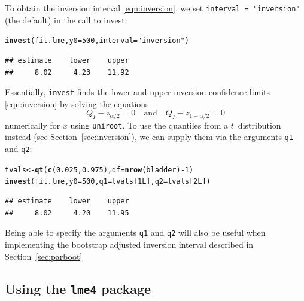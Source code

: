 \documentclass{article}\usepackage[]{graphicx}\usepackage[]{color}
\makeatletter
\newcommand{\hlnum}[1]{\textcolor[rgb]{0.686,0.059,0.569}{#1}}%
\newcommand{\hlstr}[1]{\textcolor[rgb]{0.192,0.494,0.8}{#1}}%
\newcommand{\hlopt}[1]{\textcolor[rgb]{0,0,0}{#1}}%
\newcommand{\hlstd}[1]{\textcolor[rgb]{0.345,0.345,0.345}{#1}}%
\newcommand{\hlkwb}[1]{\textcolor[rgb]{0.69,0.353,0.396}{#1}}%
\newcommand{\hlkwc}[1]{\textcolor[rgb]{0.333,0.667,0.333}{#1}}%
\newcommand{\hlkwd}[1]{\textcolor[rgb]{0.737,0.353,0.396}{\textbf{#1}}}%
\newenvironment{kframe}{%
 \def\at@end@of@kframe{}%
 \ifinner\ifhmode%
  \def\at@end@of@kframe{\end{minipage}}%
  \begin{minipage}{\columnwidth}%
 \fi\fi%
 \def\FrameCommand##1{\hskip\@totalleftmargin \hskip-\fboxsep
 \colorbox{shadecolor}{##1}\hskip-\fboxsep
     \hskip-\linewidth \hskip-\@totalleftmargin \hskip\columnwidth}%
 \MakeFramed {\advance\hsize-\width
   \@totalleftmargin\z@ \linewidth\hsize
   \@setminipage}}%
 {\par\unskip\endMakeFramed%
 \at@end@of@kframe}
\newenvironment{knitrout}{}{} %
\makeatother
\begin{document}
To obtain the inversion interval \eqref{eqn:inversion}, we set \texttt{interval = "inversion"} (the default) in the call to invest:
\begin{knitrout}
\color{fgcolor}\begin{kframe}
\begin{alltt}
\hlkwd{invest}\hlstd{(fit.lme,} \hlkwc{y0} \hlstd{=} \hlnum{500}\hlstd{,} \hlkwc{interval} \hlstd{=} \hlstr{"inversion"}\hlstd{)}
\end{alltt}
\begin{verbatim}
## estimate    lower    upper 
##     8.02     4.23    11.92
\end{verbatim}
\end{kframe}
\end{knitrout}
Essentially, \texttt{invest} finds the lower and upper inversion confidence limits \eqref{eqn:inversion} by solving the equations
\begin{equation*}
  Q_I - z_{\alpha/2} = 0 \quad \text{and} \quad Q_I - z_{1-\alpha/2} = 0
\end{equation*}
numerically for $x$ using \texttt{uniroot}. To use the quantiles from a $t$~distribution instead (see Section~\ref{sec:inversion}), we can supply them via the arguments \texttt{q1} and \texttt{q2}:
\begin{knitrout}
\color{fgcolor}\begin{kframe}
\begin{alltt}
\hlstd{tvals} \hlkwb{<-} \hlkwd{qt}\hlstd{(}\hlkwd{c}\hlstd{(}\hlnum{0.025}\hlstd{,} \hlnum{0.975}\hlstd{),} \hlkwc{df} \hlstd{=} \hlkwd{nrow}\hlstd{(bladder)} \hlopt{-} \hlnum{1}\hlstd{)}
\hlkwd{invest}\hlstd{(fit.lme,} \hlkwc{y0} \hlstd{=} \hlnum{500}\hlstd{,} \hlkwc{q1} \hlstd{= tvals[}\hlnum{1L}\hlstd{],} \hlkwc{q2} \hlstd{= tvals[}\hlnum{2L}\hlstd{])}
\end{alltt}
\begin{verbatim}
## estimate    lower    upper 
##     8.02     4.20    11.95
\end{verbatim}
\end{kframe}
\end{knitrout}
Being able to specify the arguments \texttt{q1} and \texttt{q2} will also be useful when implementing the bootstrap adjusted inversion interval described in Section~\ref{sec:parboot}


\subsection[Using the lme4 package]{Using the \texttt{lme4} package}
\label{sec:lme4}
\end{document}

